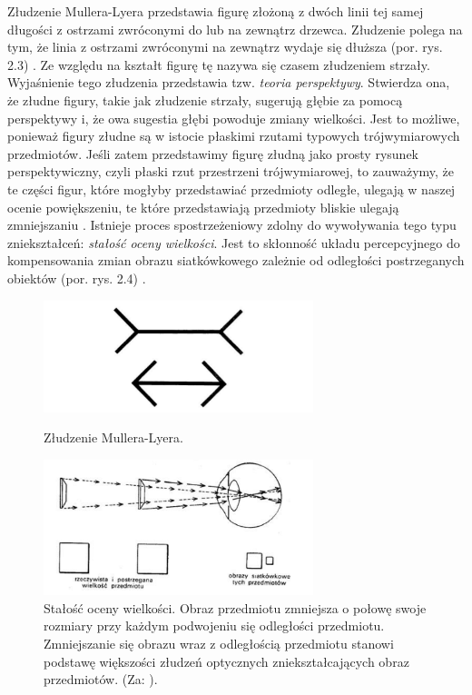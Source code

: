 \documentclass[licencjacka]{kdypl}
\begin{document}
Złudzenie Mullera-Lyera przedstawia figurę złożoną  z dwóch linii tej samej długości z  ostrzami zwróconymi do lub na zewnątrz drzewca. Złudzenie polega na tym, że linia z ostrzami zwróconymi na zewnątrz wydaje się dłuższa (por. rys. 2.3) \citep[s. 162-163]{Gregory}. Ze względu na kształt figurę tę nazywa się czasem złudzeniem strzały. Wyjaśnienie tego złudzenia przedstawia tzw. \textit{teoria perspektywy}. Stwierdza ona, że złudne figury, takie jak złudzenie strzały, sugerują głębie za pomocą perspektywy i, że owa sugestia głębi powoduje zmiany wielkości. Jest to możliwe, ponieważ figury złudne są w istocie płaskimi rzutami typowych trójwymiarowych przedmiotów. Jeśli zatem przedstawimy figurę złudną jako prosty rysunek perspektywiczny, czyli płaski rzut przestrzeni trójwymiarowej, to zauważymy, że te części figur,  które mogłyby przedstawiać przedmioty odległe, ulegają w naszej ocenie powiększeniu, te które przedstawiają przedmioty bliskie ulegają zmniejszaniu \citep[s. 171]{Gregory}. Istnieje proces spostrzeżeniowy zdolny do wywoływania tego typu zniekształceń: \textit{stałość oceny wielkości}. Jest to skłonność układu percepcyjnego do kompensowania zmian obrazu siatkówkowego zależnie od odległości postrzeganych obiektów (por. rys. 2.4) \citep[s. 175-176]{Gregory}.

\begin{figure}[H]
\includegraphics[width=0.7\textwidth]{muller.png}
\centering
\caption{Złudzenie Mullera-Lyera.}

\includegraphics[width=0.7\textwidth]{stalosc.PNG}
\centering
\caption{Stałość oceny wielkości. Obraz przedmiotu zmniejsza o połowę swoje rozmiary przy każdym podwojeniu się odległości przedmiotu. Zmniejszanie się obrazu wraz z odległością przedmiotu stanowi podstawę większości złudzeń optycznych zniekształcających obraz przedmiotów. (Za: \citealt[s. 176]{Gregory}).}
\end{figure}
\end{document}
